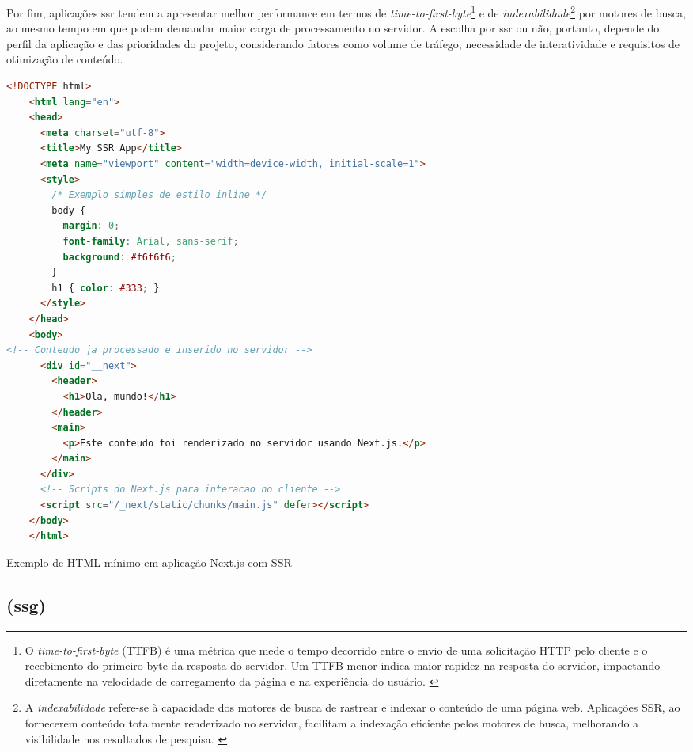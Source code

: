 Por fim, aplicações \acrshort{ssr} tendem a apresentar melhor performance em termos de \emph{time-to-first-byte}\footnote{O \emph{time-to-first-byte} (TTFB) é uma métrica que mede o tempo decorrido entre o envio de uma solicitação HTTP pelo cliente e o recebimento do primeiro byte da resposta do servidor. Um TTFB menor indica maior rapidez na resposta do servidor, impactando diretamente na velocidade de carregamento da página e na experiência do usuário. \cite{ttfb-craig}} e de \emph{indexabilidade}\footnote{A \emph{indexabilidade} refere-se à capacidade dos motores de busca de rastrear e indexar o conteúdo de uma página web. Aplicações SSR, ao fornecerem conteúdo totalmente renderizado no servidor, facilitam a indexação eficiente pelos motores de busca, melhorando a visibilidade nos resultados de pesquisa. \cite{ttfb-oskay}} por motores de busca, ao mesmo tempo em que podem demandar maior carga de processamento no servidor. A escolha por \acrshort{ssr} ou não, portanto, depende do perfil da aplicação e das prioridades do projeto, considerando fatores como volume de tráfego, necessidade de interatividade e requisitos de otimização de conteúdo.

\begin{codigo}[H]
  \begin{lstlisting}[language=html]
    <!DOCTYPE html>
    <html lang="en">
    <head>
      <meta charset="utf-8">
      <title>My SSR App</title>
      <meta name="viewport" content="width=device-width, initial-scale=1">
      <style>
        /* Exemplo simples de estilo inline */
        body {
          margin: 0;
          font-family: Arial, sans-serif;
          background: #f6f6f6;
        }
        h1 { color: #333; }
      </style>
    </head>
    <body>
<!-- Conteudo ja processado e inserido no servidor -->
      <div id="__next">
        <header>
          <h1>Ola, mundo!</h1>
        </header>
        <main>
          <p>Este conteudo foi renderizado no servidor usando Next.js.</p>
        </main>
      </div>
      <!-- Scripts do Next.js para interacao no cliente -->
      <script src="/_next/static/chunks/main.js" defer></script>
    </body>
    </html>
  \end{lstlisting}
  \caption{Exemplo de HTML mínimo em aplicação Next.js com SSR}
  \label{cod:nextjs_html}
\end{codigo}

\subsection{ (\acrshort{ssg})}
\label{subsec:ssg}

